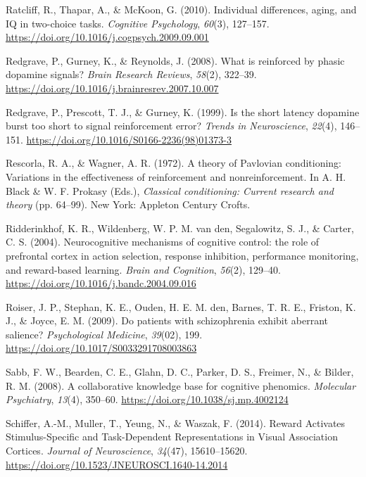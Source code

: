 \documentclass[12pt,openany]{book}
\theoremstyle{definition}
\theoremstyle{definition}
\theoremstyle{definition}
\theoremstyle{remark}
\begin{document}
\hypertarget{ref-Ratcliff2010}{}
Ratcliff, R., Thapar, A., \& McKoon, G. (2010). Individual differences,
aging, and IQ in two-choice tasks. \emph{Cognitive Psychology},
\emph{60}(3), 127--157.
\url{https://doi.org/10.1016/j.cogpsych.2009.09.001}

\hypertarget{ref-Redgrave2008}{}
Redgrave, P., Gurney, K., \& Reynolds, J. (2008). What is reinforced by
phasic dopamine signals? \emph{Brain Research Reviews}, \emph{58}(2),
322--39. \url{https://doi.org/10.1016/j.brainresrev.2007.10.007}

\hypertarget{ref-Redgrave1999}{}
Redgrave, P., Prescott, T. J., \& Gurney, K. (1999). Is the short
latency dopamine burst too short to signal reinforcement error?
\emph{Trends in Neuroscience}, \emph{22}(4), 146--151.
\url{https://doi.org/10.1016/S0166-2236(98)01373-3}

\hypertarget{ref-Rescorla1972}{}
Rescorla, R. A., \& Wagner, A. R. (1972). A theory of Pavlovian
conditioning: Variations in the effectiveness of reinforcement and
nonreinforcement. In A. H. Black \& W. F. Prokasy (Eds.),
\emph{Classical conditioning: Current research and theory} (pp. 64--99).
New York: Appleton Century Crofts.

\hypertarget{ref-Ridderinkhof2004}{}
Ridderinkhof, K. R., Wildenberg, W. P. M. van den, Segalowitz, S. J., \&
Carter, C. S. (2004). Neurocognitive mechanisms of cognitive control:
the role of prefrontal cortex in action selection, response inhibition,
performance monitoring, and reward-based learning. \emph{Brain and
Cognition}, \emph{56}(2), 129--40.
\url{https://doi.org/10.1016/j.bandc.2004.09.016}

\hypertarget{ref-Roiser2009}{}
Roiser, J. P., Stephan, K. E., Ouden, H. E. M. den, Barnes, T. R. E.,
Friston, K. J., \& Joyce, E. M. (2009). Do patients with schizophrenia
exhibit aberrant salience? \emph{Psychological Medicine}, \emph{39}(02),
199. \url{https://doi.org/10.1017/S0033291708003863}

\hypertarget{ref-Sabb2008}{}
Sabb, F. W., Bearden, C. E., Glahn, D. C., Parker, D. S., Freimer, N.,
\& Bilder, R. M. (2008). A collaborative knowledge base for cognitive
phenomics. \emph{Molecular Psychiatry}, \emph{13}(4), 350--60.
\url{https://doi.org/10.1038/sj.mp.4002124}

\hypertarget{ref-Schiffer2014}{}
Schiffer, A.-M., Muller, T., Yeung, N., \& Waszak, F. (2014). Reward
Activates Stimulus-Specific and Task-Dependent Representations in Visual
Association Cortices. \emph{Journal of Neuroscience}, \emph{34}(47),
15610--15620. \url{https://doi.org/10.1523/JNEUROSCI.1640-14.2014}
\end{document}
